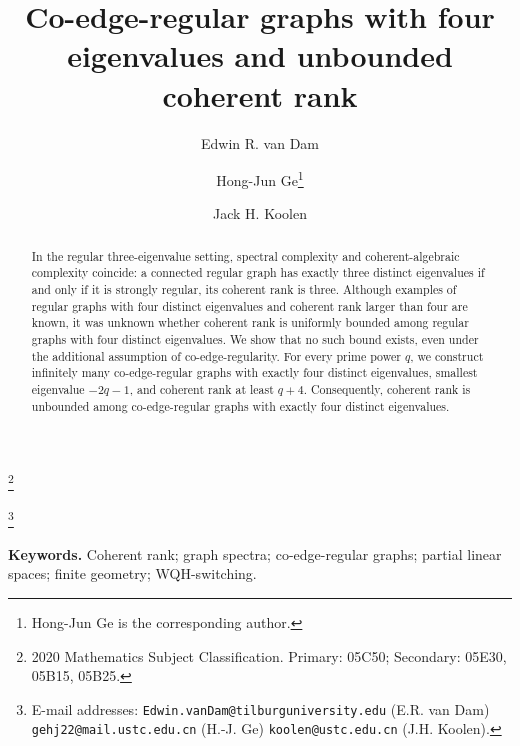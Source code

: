 \documentclass[reqno,a4paper,11pt]{article}
\theoremstyle{definition}
\theoremstyle{remark}
\begin{document}
	\title{\bf Co-edge-regular graphs with four eigenvalues and unbounded coherent rank}
	\author[a]{Edwin R. van Dam}
	\author[a,b]{Hong-Jun Ge\footnote{Hong-Jun Ge is the corresponding author.}}
	\author[b,c]{Jack H. Koolen}
	
	
	\maketitle
	\pagestyle{plain}
	
	\newcommand\blfootnote[1]{%
		\begingroup
		\renewcommand\thefootnote{}\footnote{#1}%
		\addtocounter{footnote}{-1}%
		\endgroup}
\blfootnote{2020 Mathematics Subject Classification. Primary: 05C50; Secondary: 05E30, 05B15, 05B25.}
	\blfootnote{E-mail addresses:  {\tt Edwin.vanDam@tilburguniversity.edu} (E.R. van Dam)  {\tt gehj22@mail.ustc.edu.cn} (H.-J. Ge) {\tt koolen@ustc.edu.cn} (J.H. Koolen).}
	
\vspace{-11pt}




\begin{abstract}
In the regular three-eigenvalue setting, spectral complexity and coherent-algebraic complexity coincide: a connected regular graph has exactly three distinct eigenvalues if and only if it is strongly regular, its coherent rank is three.
Although examples of regular graphs with four distinct eigenvalues and coherent rank larger than four are known, 
it was unknown whether coherent rank is uniformly bounded among regular graphs with four distinct eigenvalues.
	We show that no such bound exists, even under the additional assumption of co-edge-regularity.
	For every prime power \(q\), we construct infinitely many co-edge-regular graphs with exactly four distinct eigenvalues, smallest eigenvalue \(-2q-1\), and coherent rank at least \(q+4\).
	Consequently, coherent rank is unbounded among co-edge-regular graphs with exactly four distinct eigenvalues.
\end{abstract}


\noindent\textbf{Keywords.} Coherent rank; graph spectra; co-edge-regular graphs; partial linear spaces; finite geometry; WQH-switching.
\end{document}
